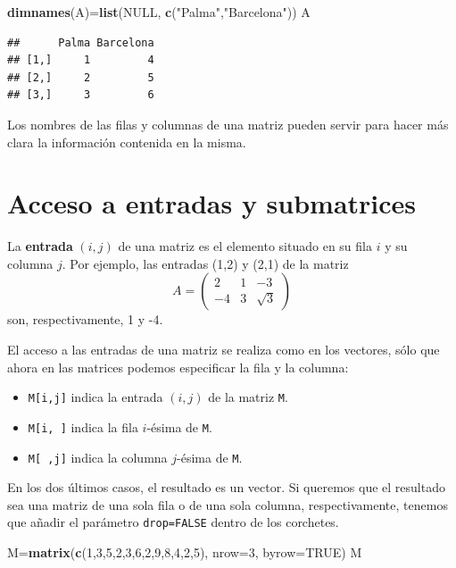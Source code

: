 \documentclass[]{book}
\newenvironment{Shaded}{\begin{snugshade}}{\end{snugshade}}
\newcommand{\DataTypeTok}[1]{\textcolor[rgb]{0.13,0.29,0.53}{#1}}
\newcommand{\DecValTok}[1]{\textcolor[rgb]{0.00,0.00,0.81}{#1}}
\newcommand{\KeywordTok}[1]{\textcolor[rgb]{0.13,0.29,0.53}{\textbf{#1}}}
\newcommand{\NormalTok}[1]{#1}
\newcommand{\OtherTok}[1]{\textcolor[rgb]{0.56,0.35,0.01}{#1}}
\newcommand{\StringTok}[1]{\textcolor[rgb]{0.31,0.60,0.02}{#1}}
\theoremstyle{definition}
\theoremstyle{definition}
\theoremstyle{definition}
\theoremstyle{remark}
\begin{document}
\begin{Shaded}
\begin{Highlighting}[]
\KeywordTok{dimnames}\NormalTok{(A)=}\KeywordTok{list}\NormalTok{(}\OtherTok{NULL}\NormalTok{, }\KeywordTok{c}\NormalTok{(}\StringTok{"Palma"}\NormalTok{,}\StringTok{"Barcelona"}\NormalTok{))}
\NormalTok{A}
\end{Highlighting}
\end{Shaded}

\begin{verbatim}
##      Palma Barcelona
## [1,]     1         4
## [2,]     2         5
## [3,]     3         6
\end{verbatim}

Los nombres de las filas y columnas de una matriz pueden servir para hacer más clara la información contenida en la misma.

\hypertarget{sec:entrmatr}{%
\section{Acceso a entradas y submatrices}\label{sec:entrmatr}}

La \textbf{entrada} \((i, j)\) de una matriz es el elemento situado en su fila \(i\) y su columna \(j\). Por ejemplo, las entradas (1,2) y (2,1) de la matriz
\[
A = \left(\begin{matrix}
2 & 1 & -3\\ -4 & 3 & \sqrt{3}\end{matrix}
\right)
\]
son, respectivamente, 1 y -4.

El acceso a las entradas de una matriz se realiza como en los vectores, sólo que ahora en las matrices podemos especificar la fila y la columna:

\begin{itemize}
\item
  \texttt{M{[}i,j{]}} indica la entrada \((i, j)\) de la matriz \texttt{M}.
\item
  \texttt{M{[}i,\ {]}} indica la fila \(i\)-ésima de \texttt{M}.
\item
  \texttt{M{[}\ ,j{]}} indica la columna \(j\)-ésima de \texttt{M}.
\end{itemize}

En los dos últimos casos, el resultado es un vector. Si queremos que el resultado sea una matriz de una sola fila o de una sola columna, respectivamente, tenemos que añadir el parámetro \texttt{drop=FALSE} dentro de los corchetes.

\begin{Shaded}
\begin{Highlighting}[]
\NormalTok{M=}\KeywordTok{matrix}\NormalTok{(}\KeywordTok{c}\NormalTok{(}\DecValTok{1}\NormalTok{,}\DecValTok{3}\NormalTok{,}\DecValTok{5}\NormalTok{,}\DecValTok{2}\NormalTok{,}\DecValTok{3}\NormalTok{,}\DecValTok{6}\NormalTok{,}\DecValTok{2}\NormalTok{,}\DecValTok{9}\NormalTok{,}\DecValTok{8}\NormalTok{,}\DecValTok{4}\NormalTok{,}\DecValTok{2}\NormalTok{,}\DecValTok{5}\NormalTok{), }\DataTypeTok{nrow=}\DecValTok{3}\NormalTok{, }\DataTypeTok{byrow=}\OtherTok{TRUE}\NormalTok{)}
\NormalTok{M}
\end{Highlighting}
\end{Shaded}
\end{document}
